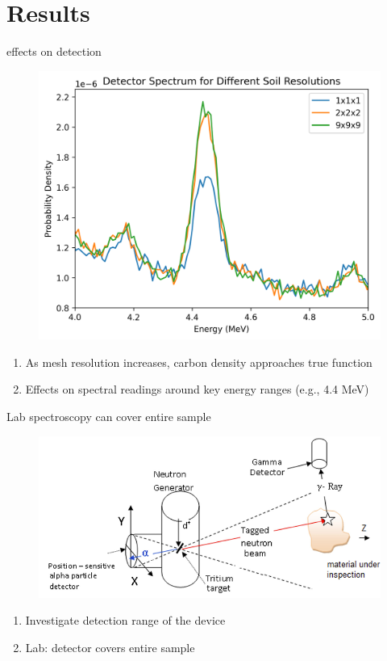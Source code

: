 \documentclass[10pt,hyperref={colorlinks,citecolor=blue,urlcolor=peking_blue,linkcolor=}]{beamer}
\theoremstyle{plain}
\begin{document}
\section{Results}
\begin{frame}{effects on detection}
\begin{figure}[Effects of resolution on detection]
\begin{center}
\includegraphics[width=.5\linewidth]{../Figures/MCNP/Effectsofresolutionondetection.png}
\end{center}
\end{figure}
\begin{enumerate}
\item As mesh resolution increases, carbon density approaches true function
\item Effects on spectral readings around key energy ranges (e.g., 4.4 MeV)
\end{enumerate}
\end{frame}
\begin{frame}{Lab spectroscopy can cover entire sample}
\begin{figure}[Lab Spectroscopy]
\begin{center}
\includegraphics[width=1\linewidth]{../Figures/Misc/LabSpectros.png}
\end{center}
\end{figure}
\begin{enumerate}
\item Investigate detection range of the device
\item Lab: detector covers entire sample
\end{enumerate}
\end{frame}
\end{document}
